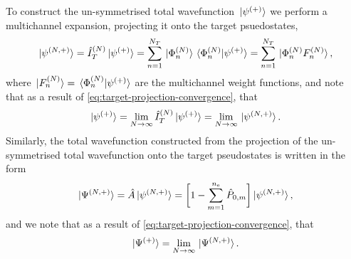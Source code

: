 \documentclass[draft]{article}
\begin{document}
To construct the un-symmetrised total wavefunction $\ket*{\psi^{(+)}}$ we
perform a multichannel expansion, projecting it onto the target psuedostates,
\begin{equation}
  \label{eq:total-wavefunction-un-symmetrised-n}
  \ket*{\psi^{\lr{N, +}}}
  =
  \hat{I}_{T}^{\lr{N}}
  \ket*{\psi^{\lr{+}}}
  =
  \sum_{n = 1}^{N_{T}}
  \ket*{\Phi_{n}^{\lr{N}}}
  \bra*{\Phi_{n}^{\lr{N}}}
  \ket*{\psi^{\lr{+}}}
  =
  \sum_{n = 1}^{N_{T}}
  \ket*{\Phi_{n}^{\lr{N}} F_{n}^{\lr{N}}}
  ,
\end{equation}
where $\ket*{F_{n}^{(N)}} = \bra*{\Phi_{n}^{(N)}}\ket*{\psi^{(+)}}$ are
the multichannel weight functions, and note that as a result of
\autoref{eq:target-projection-convergence}, that
\begin{equation}
  \label{eq:total-wavefunction-un-symmetrised-convergence}
  \ket*{\psi^{\lr{+}}}
  =
  \lim_{N \to \infty}
  \hat{I}_{T}^{\lr{N}}
  \ket*{\psi^{\lr{+}}}
  =
  \lim_{N \to \infty}
  \ket*{\psi^{\lr{N, +}}}
  .
\end{equation}
Similarly, the total wavefunction constructed from the projection of the
un-symmetrised total wavefunction onto the target pseudostates is written in the
form
\begin{equation}
  \label{eq:total-wavefunction-antisymmetrisation-n}
  \ket*{\Psi^{\lr{N, +}}}
  =
  \hat{A}
  \ket*{\psi^{\lr{N, +}}}
  =
  \lrsq[\bigg]
  {
    1
    -
    \sum_{m = 1}^{n_{\mathrm{e}}}
    \hat{P}_{0, m}
  }
  \ket*{\psi^{\lr{N, +}}}
  ,
\end{equation}
and we note that as a result of \autoref{eq:target-projection-convergence}, that
\begin{equation}
  \label{eq:total-wavefunction-antisymmetrisation-convergence}
  \ket*{\Psi^{\lr{+}}}
  =
  \lim_{N \to \infty}
  \ket*{\Psi^{\lr{N, +}}}
  .
\end{equation}
\end{document}
